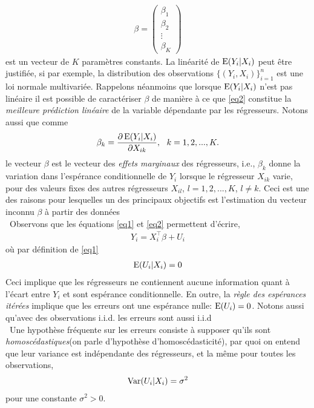 \begin{align*}
 \beta = 
 \begin{pmatrix}
 \beta_1\\
 \beta_2\\
 \vdots\\
 \beta_K
 \end{pmatrix}
\end{align*}
est un vecteur de $K$ paramètres constants. La linéarité de $\operatorname{E}(Y_i|X_i)$ peut être justifiée, si par exemple, la distribution des observations $\{(Y_i, X_i)\}_{i=1}^n$ est une loi normale multivariée. Rappelons néanmoins que lorsque $\operatorname{E}(Y_i|X_i)$ n'est pas linéaire il est possible de caractériser $\beta$ de manière à ce que \eqref{eq2} constitue la \emph{meilleure prédiction linéaire} de la variable dépendante par les régresseurs. Notons aussi que comme
\begin{align*}
\beta_k = \frac{\partial \Exp(Y_i|X_i)}{\partial X_{ik}}, \ \ k=1,2,...,K.
\end{align*}
le vecteur $\beta$ est le vecteur des \emph{effets marginaux} des régresseurs, i.e., $\beta_k$ donne la variation dans l'espérance  conditionnelle de $Y_i$ lorsque le régresseur $X_{ik}$ varie, pour des valeurs fixes des autres régresseurs $X_{il}$, $l=1,2,...,K$, $l\neq k$. Ceci est une des raisons pour lesquelles un des principaux objectifs est l'estimation du vecteur inconnu $\beta$ à partir des données\\\
Observons que les équations \eqref{eq1} et \eqref{eq2} permettent d'écrire,
\begin{align}
Y_i = X_i^\top\beta +U_i
\label{eq3}
\end{align}
où par définition de \eqref{eq1}
\begin{align}
\operatorname{E}(U_i|X_i) = 0
\label{eq4}
\end{align}
Ceci implique que les régresseurs ne contiennent aucune information quant à l'écart entre $Y_i$ et sont espérance conditionnelle. En outre, la \emph{règle des espérances itérées} implique que les erreurs ont une espérance nulle: $\operatorname{E}(U_i) = 0$. Notons aussi qu'avec des observations i.i.d. les erreurs sont aussi i.i.d\\\
Une hypothèse fréquente sur les erreurs consiste à supposer qu'ils sont \emph{homoscédastiques}(on parle d'hypothèse d'homoscédasticité), par quoi on entend que leur variance est indépendante des régresseurs, et la même pour toutes les observations,
\begin{align*}
\operatorname{Var}(U_i|X_i) = \sigma^2
\end{align*}
pour une constante $\sigma^2>0$.

